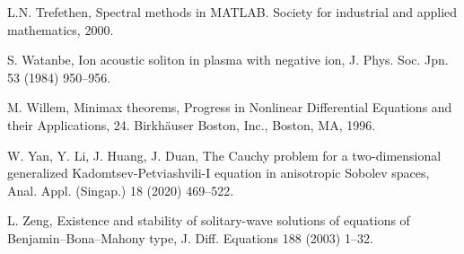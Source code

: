 \documentclass[10pt]{article}
\numberwithin{equation}{section}
\begin{document}
\begin{thebibliography}{00}
			L.N. Trefethen,
			Spectral methods in MATLAB. Society for industrial and applied mathematics, 2000.
			
			S. Watanbe, 
			Ion acoustic soliton in plasma with negative ion,
			J. Phys. Soc. Jpn. 53 (1984) 950--956.
			
			M. Willem,   
			Minimax theorems,
			Progress in Nonlinear Differential Equations and their Applications, 24. Birkhäuser Boston, Inc., Boston, MA, 1996. 
			
			
			
			W. Yan,    Y. Li,   J. Huang, J.  Duan,  
			The Cauchy problem for a two-dimensional generalized Kadomtsev-Petviashvili-I equation in anisotropic Sobolev spaces,
			Anal. Appl. (Singap.) 18 (2020)  469--522. 
			
			
			L. Zeng,
			Existence and stability of solitary-wave solutions of equations of Benjamin–Bona–Mahony type,
			J. Diff. Equations 188 (2003) 1--32.
			
		\end{thebibliography}
		
	
\end{document}
